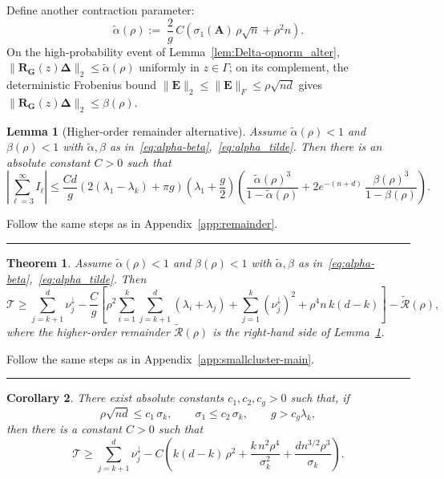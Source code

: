\documentclass{article}
\newcommand{\twonorm}[1]{\|#1\|_2}
\newcommand{\Ab}{\mathbf{A}}
\newcommand{\Eb}{\mathbf{E}}
\newcommand{\Gb}{\mathbf{G}}
\newcommand{\Rb}{\mathbf{R}}
\newcommand{\Rcal}{\mathcal{R}}
\newcommand{\Tcal}{\mathcal{T}}
\newcommand{\BlackBox}{\rule{1.5ex}{1.5ex}}  %
\newenvironment{proof}{\par\noindent{\bf Proof\ }}{\hfill\BlackBox\par\medskip}
\newtheorem{theorem}{Theorem}
\newtheorem{lemma}{Lemma}[section]
\newtheorem{corollary}[theorem]{Corollary}
\newcommand{\rbr}[1]{\left(#1\right)}
\newcommand{\sbr}[1]{\left[#1\right]}
\newcommand{\abr}[1]{\left|#1\right|}
\newcommand{\Deltab}{\boldsymbol{\Delta}}
\begin{document}
Define another contraction parameter:
\begin{equation}\label{eq:alpha_tilde}
    \tilde{\alpha}(\rho):= \; \frac{2}{g}\,C\rbr{\sigma_1(\Ab)\,\rho\sqrt{n} + \rho^2 n}.
\end{equation}
On the high-probability event of Lemma~\ref{lem:Delta-opnorm_alter}, $\twonorm{\Rb_\Gb(z)\Deltab} \le \tilde{\alpha}(\rho)$ uniformly in $z\in\Gamma$; on its complement, the deterministic Frobenius bound $\twonorm{\Eb}\le\|\Eb\|_F\le\rho\sqrt{nd}$ gives $\twonorm{\Rb_\Gb(z)\Deltab}\le\beta(\rho)$.

\begin{lemma}[Higher-order remainder alternative]\label{lem:remainder_alter}
Assume $\tilde{\alpha}(\rho) < 1$ and $\beta(\rho) < 1$ with $\tilde{\alpha},\beta$ as in~\eqref{eq:alpha-beta},~\eqref{eq:alpha_tilde}. Then there is an absolute constant $C > 0$ such that
\begin{equation*}
    \abr{\sum_{\ell=3}^{\infty} I_\ell} \le \frac{Cd}{g}\rbr{2(\lambda_1 - \lambda_k) + \pi g}\rbr{\lambda_1 + \frac{g}{2}}\rbr{\frac{\tilde{\alpha}(\rho)^3}{1 - \tilde{\alpha}(\rho)} + 2 e^{-(n+d)}\,\frac{\beta(\rho)^3}{1 - \beta(\rho)}}.
\end{equation*}
\end{lemma}

\begin{proof}
    Follow the same steps as in Appendix~\ref{app:remainder}.
\end{proof}

\begin{theorem}\label{thm:smallcluster-main_alter}
Assume $\tilde{\alpha}(\rho) < 1$ and $\beta(\rho) < 1$ with $\tilde{\alpha}, \beta$ as in~\eqref{eq:alpha-beta},~\eqref{eq:alpha_tilde}. Then
\begin{equation*}
    \Tcal \ge \sum_{j=k+1}^{d}\nu_j^\downarrow - \frac{C}{g}\sbr{\rho^2 \sum_{i=1}^{k}\sum_{j=k+1}^{d}(\lambda_i + \lambda_j) + \sum_{j=1}^{k}\rbr{\nu_j^\downarrow}^2 + \rho^4 n\, k(d-k)} - \tilde{\Rcal}(\rho),
\end{equation*}
where the higher-order remainder $\tilde{\Rcal}(\rho)$ is the right-hand side of Lemma~\ref{lem:remainder_alter}.
\end{theorem}
\begin{proof}
    Follow the same steps as in Appendix~\ref{app:smallcluster-main}.
\end{proof}

\begin{corollary}\label{cor:smallcluster_alter}
There exist absolute constants $c_1, c_2, c_g > 0$ such that, if
\begin{equation*}
    \rho\sqrt{nd} \le c_1\,\sigma_k, \qquad \sigma_1 \le c_2\,\sigma_k, \qquad g > c_g \lambda_k,
\end{equation*}
then there is a constant $C > 0$ such that
\begin{equation*}
    \Tcal \ge \sum_{j=k+1}^{d}\nu_j^\downarrow - C\rbr{k(d-k)\,\rho^2 + \frac{k\,n^2 \rho^4}{\sigma_k^2} + \frac{d n^{3/2}\rho^3}{\sigma_k}}.
\end{equation*}
\end{corollary}
\end{document}

